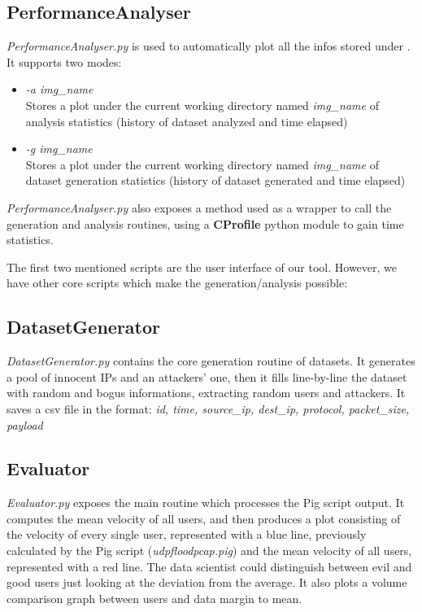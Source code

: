 \subsection{PerformanceAnalyser}
\textit{PerformanceAnalyser.py} is used to automatically plot all the infos stored under . It supports two modes:
	\begin{itemize}
		\item \textit{-a img\_name} \\ Stores a plot under the current working directory named \textit{img\_name} of analysis statistics (history of dataset analyzed and time elapsed)
		\item \textit{-g img\_name} \\ Stores a plot under the current working directory named \textit{img\_name} of dataset generation statistics (history of dataset generated and time elapsed)
	\end{itemize}

\textit{PerformanceAnalyser.py} also exposes a method used as a wrapper to call the generation and analysis routines, using a \textbf{CProfile} python module to gain time statistics.

\bigskip
The first two mentioned scripts are the user interface of our tool. However, we have other core scripts which make the generation/analysis possible:

\subsection{DatasetGenerator}
\textit{DatasetGenerator.py} contains the core generation routine of datasets. It generates a pool of innocent IPs and an attackers' one, then it fills line-by-line the dataset with random and bogus informations, extracting random users and attackers. It saves a csv file in the format: \textit{id, time, source\_ip, dest\_ip, protocol, packet\_size, payload}

\subsection{Evaluator} 
\textit{Evaluator.py} exposes the main routine which processes the Pig script output. It computes the mean velocity of all users, and then produces a plot consisting of the velocity of every single user, represented with a blue line, previously calculated by the Pig script (\textit{udpfloodpcap.pig}) and the mean velocity of all users, represented with a red line. The data scientist could distinguish between evil and good users just looking at the deviation from the average. It also plots a volume comparison graph between users and data margin to mean.

